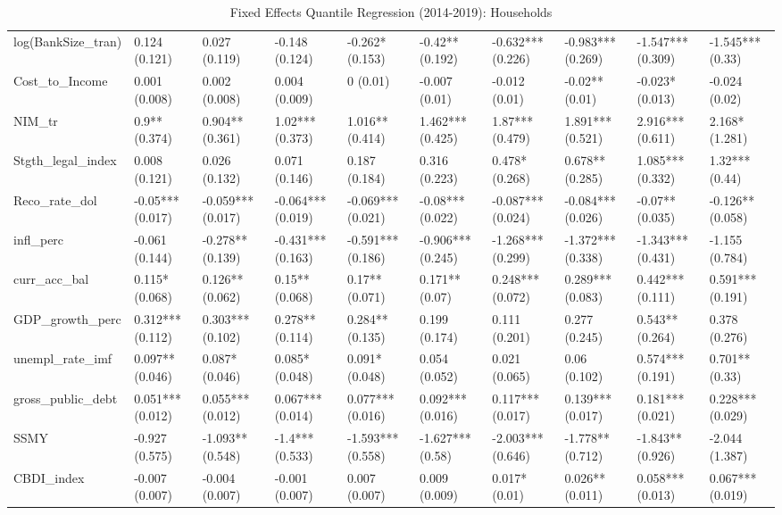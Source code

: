 \begin{table}[H]
\begin{subtable}[c]{\textwidth}
{\begin{tabular}{llllllllll}
  log(BankSize\_tran) & 0.124 (0.121) & 0.027 (0.119) & -0.148 (0.124) & -0.262* (0.153) & -0.42** (0.192) & -0.632*** (0.226) & -0.983*** (0.269) & -1.547*** (0.309) & -1.545*** (0.33) \\ 
  Cost\_to\_Income & 0.001 (0.008) & 0.002 (0.008) & 0.004 (0.009) & 0 (0.01) & -0.007 (0.01) & -0.012 (0.01) & -0.02** (0.01) & -0.023* (0.013) & -0.024 (0.02) \\ 
  NIM\_tr & 0.9** (0.374) & 0.904** (0.361) & 1.02*** (0.373) & 1.016** (0.414) & 1.462*** (0.425) & 1.87*** (0.479) & 1.891*** (0.521) & 2.916*** (0.611) & 2.168* (1.281) \\ 
  Stgth\_legal\_index & 0.008 (0.121) & 0.026 (0.132) & 0.071 (0.146) & 0.187 (0.184) & 0.316 (0.223) & 0.478* (0.268) & 0.678** (0.285) & 1.085*** (0.332) & 1.32*** (0.44) \\ 
  Reco\_rate\_dol & -0.05*** (0.017) & -0.059*** (0.017) & -0.064*** (0.019) & -0.069*** (0.021) & -0.08*** (0.022) & -0.087*** (0.024) & -0.084*** (0.026) & -0.07** (0.035) & -0.126** (0.058) \\ 
  infl\_perc & -0.061 (0.144) & -0.278** (0.139) & -0.431*** (0.163) & -0.591*** (0.186) & -0.906*** (0.245) & -1.268*** (0.299) & -1.372*** (0.338) & -1.343*** (0.431) & -1.155 (0.784) \\ 
  curr\_acc\_bal & 0.115* (0.068) & 0.126** (0.062) & 0.15** (0.068) & 0.17** (0.071) & 0.171** (0.07) & 0.248*** (0.072) & 0.289*** (0.083) & 0.442*** (0.111) & 0.591*** (0.191) \\ 
  GDP\_growth\_perc & 0.312*** (0.112) & 0.303*** (0.102) & 0.278** (0.114) & 0.284** (0.135) & 0.199 (0.174) & 0.111 (0.201) & 0.277 (0.245) & 0.543** (0.264) & 0.378 (0.276) \\ 
  unempl\_rate\_imf & 0.097** (0.046) & 0.087* (0.046) & 0.085* (0.048) & 0.091* (0.048) & 0.054 (0.052) & 0.021 (0.065) & 0.06 (0.102) & 0.574*** (0.191) & 0.701** (0.33) \\ 
  gross\_public\_debt & 0.051*** (0.012) & 0.055*** (0.012) & 0.067*** (0.014) & 0.077*** (0.016) & 0.092*** (0.016) & 0.117*** (0.017) & 0.139*** (0.017) & 0.181*** (0.021) & 0.228*** (0.029) \\ 
  SSMY & -0.927 (0.575) & -1.093** (0.548) & -1.4*** (0.533) & -1.593*** (0.558) & -1.627*** (0.58) & -2.003*** (0.646) & -1.778** (0.712) & -1.843** (0.926) & -2.044 (1.387) \\ 
  CBDI\_index & -0.007 (0.007) & -0.004 (0.007) & -0.001 (0.007) & 0.007 (0.007) & 0.009 (0.009) & 0.017* (0.01) & 0.026** (0.011) & 0.058*** (0.013) & 0.067*** (0.019) \\ 
   \bottomrule
\end{tabular}}
\end{subtable}

\caption{Fixed Effects Quantile Regression (2014-2019): Households} 
\label{qrfe_npl_hh}
\end{table}
